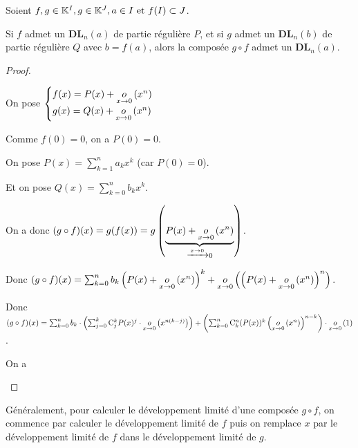 \documentclass[12pt, a4paper]{report}
\begin{document}
\begin{remark}
    Soient $f,g \in \mathbb{K}^I, g\in \mathbb{K}^J, a \in I\text{ et } f(I)\subset J$.

    Si $f$ admet un $\mathbf{DL}_n(a)$ de partie régulière $P$, et si $g$ admet un $\mathbf{DL}_n(b)$ de partie régulière $Q$ avec $b = f(a)$, alors la composée $g\circ f$ admet un $\mathbf{DL}_n(a)$.
\end{remark}

\begin{proof}
    \begin{outline}
        \1 On pose $\begin{cases}
        f(x) = P(x) + \underset{x\to0}{o}\left(x^n\right)\\
        g(x) = Q(x) + \underset{x\to0}{o}\left(x^n\right)
        \end{cases}$

        \1 Comme $f(0)=0$, on a $P(0)=0$.

        \1 On pose $P(x) = \sum_{k=1}^{n} a_k x^k$ (car $P(0)=0$).

        \1 Et on pose $Q(x) = \sum_{k=0}^{n} b_k x^k$.

        \1 On a donc $(g\circ f)(x) = g(f(x)) = g\left(\underbrace{P(x) + \underset{x\to0}{o}\left(x^n\right)}_{\xrightarrow{x\to 0}0}\right)$.

        \1 Donc $(g\circ f)(x) = \sum_{k=0}^{n}b_k\left(P(x) + \underset{x\to0}{o}\left(x^n\right)\right)^k + \underset{x\to0}{o}\left(\left(P(x) + \underset{x\to0}{o}\left(x^n\right)\right)^n\right)$.

        \1 Donc $(g\circ f)(x) = \sum_{k=0}^{n}b_k \cdot \left(\sum_{j=0}^{k}\mathrm{C}_{j}^{k} P(x)^j \cdot \underset{x\to0}{o}\left(x^{n(k-j)}\right)\right) + \left(\sum_{k=0}^{n}\mathrm{C}_{k}^{n}(P(x))^k\left(\underset{x\to0}{o}\left(x^n\right)\right)^{n-k}\right)\cdot \underset{x\to0}{o}\left(1\right)$.

        \1 On a 
    \end{outline}
\end{proof}

\begin{methodbox}
    Généralement, pour calculer le développement limité d'une composée $g\circ f$, on commence par calculer le développement limité de $f$ puis on remplace $x$ par le développement limité de $f$ dans le développement limité de $g$.
\end{methodbox}
\end{document}
